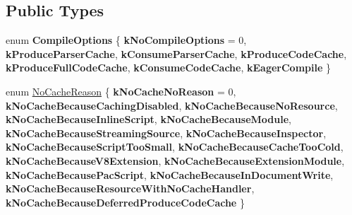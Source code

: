 \subsection*{Public Types}
\begin{DoxyCompactItemize}
\item 
\mbox{\label{classv8_1_1ScriptCompiler_aa6db7774ab5d8793cd88db6b35a71818}} 
enum {\bfseries Compile\+Options} \{ \newline
{\bfseries k\+No\+Compile\+Options} = 0, 
{\bfseries k\+Produce\+Parser\+Cache}, 
{\bfseries k\+Consume\+Parser\+Cache}, 
{\bfseries k\+Produce\+Code\+Cache}, 
\newline
{\bfseries k\+Produce\+Full\+Code\+Cache}, 
{\bfseries k\+Consume\+Code\+Cache}, 
{\bfseries k\+Eager\+Compile}
 \}
\item 
enum \mbox{\hyperlink{classv8_1_1ScriptCompiler_a7f13fa15484cfc500ae51927756e0d60}{No\+Cache\+Reason}} \{ \newline
{\bfseries k\+No\+Cache\+No\+Reason} = 0, 
{\bfseries k\+No\+Cache\+Because\+Caching\+Disabled}, 
{\bfseries k\+No\+Cache\+Because\+No\+Resource}, 
{\bfseries k\+No\+Cache\+Because\+Inline\+Script}, 
\newline
{\bfseries k\+No\+Cache\+Because\+Module}, 
{\bfseries k\+No\+Cache\+Because\+Streaming\+Source}, 
{\bfseries k\+No\+Cache\+Because\+Inspector}, 
{\bfseries k\+No\+Cache\+Because\+Script\+Too\+Small}, 
\newline
{\bfseries k\+No\+Cache\+Because\+Cache\+Too\+Cold}, 
{\bfseries k\+No\+Cache\+Because\+V8\+Extension}, 
{\bfseries k\+No\+Cache\+Because\+Extension\+Module}, 
{\bfseries k\+No\+Cache\+Because\+Pac\+Script}, 
\newline
{\bfseries k\+No\+Cache\+Because\+In\+Document\+Write}, 
{\bfseries k\+No\+Cache\+Because\+Resource\+With\+No\+Cache\+Handler}, 
{\bfseries k\+No\+Cache\+Because\+Deferred\+Produce\+Code\+Cache}
 \}
\end{DoxyCompactItemize}
